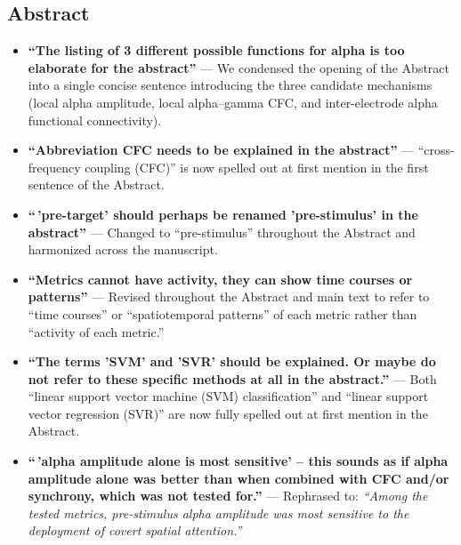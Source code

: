 \documentclass[11pt]{article}
\begin{document}
\subsection*{Abstract}
\begin{itemize}[leftmargin=1.5em]
    \item \textbf{``The listing of 3 different possible functions for alpha is too elaborate for the abstract''} --- \textcolor{revblue}{We condensed the opening of the Abstract into a single concise sentence introducing the three candidate mechanisms (local alpha amplitude, local alpha--gamma CFC, and inter-electrode alpha functional connectivity).}
    \item \textbf{``Abbreviation CFC needs to be explained in the abstract''} --- \textcolor{revblue}{``cross-frequency coupling (CFC)'' is now spelled out at first mention in the first sentence of the Abstract.}
    \item \textbf{``\,'pre-target' should perhaps be renamed 'pre-stimulus' in the abstract''} --- \textcolor{revblue}{Changed to ``pre-stimulus'' throughout the Abstract and harmonized across the manuscript.}
    \item \textbf{``Metrics cannot have activity, they can show time courses or patterns''} --- \textcolor{revblue}{Revised throughout the Abstract and main text to refer to ``time courses'' or ``spatiotemporal patterns'' of each metric rather than ``activity of each metric.''}
    \item \textbf{``The terms 'SVM' and 'SVR' should be explained. Or maybe do not refer to these specific methods at all in the abstract.''} --- \textcolor{revblue}{Both ``linear support vector machine (SVM) classification'' and ``linear support vector regression (SVR)'' are now fully spelled out at first mention in the Abstract.}
    \item \textbf{``\,'alpha amplitude alone is most sensitive' -- this sounds as if alpha amplitude alone was better than when combined with CFC and/or synchrony, which was not tested for.''} --- \textcolor{revblue}{Rephrased to: \textit{``Among the tested metrics, pre-stimulus alpha amplitude was most sensitive to the deployment of covert spatial attention.''}}
\end{itemize}
\end{document}
